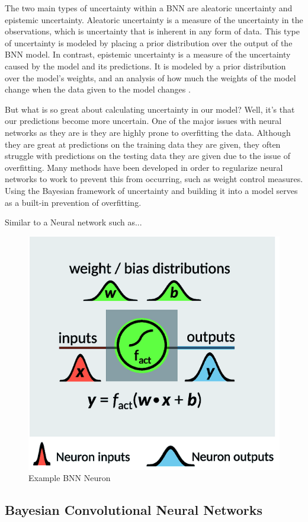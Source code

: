 \documentclass[12pt]{article}
\begin{document}
The two main types of uncertainty within a BNN are aleatoric uncertainty and epistemic uncertainty. Aleatoric uncertainty is a measure of the uncertainty in the observations, which is uncertainty that is inherent in any form of data. This type of uncertainty is modeled by placing a prior distribution over the output of the BNN model. In contrast, epistemic uncertainty is a measure of the uncertainty caused by the model and its predictions. It is modeled by a prior distribution over the model's weights, and an analysis of how much the weights of the model change when the data given to the model changes \cite{shridhar2019comprehensive}.

But what is so great about calculating uncertainty in our model? Well, it's that our predictions become more uncertain. One of the major issues with neural networks as they are is they are highly prone to overfitting the data. Although they are great at predictions on the training data they are given, they often struggle with predictions on the testing data they are given due to the issue of overfitting. Many methods have been developed in order to regularize neural networks to work to prevent this from occurring, such as weight control measures. Using the Bayesian framework of uncertainty and building it into a model serves as a built-in prevention of overfitting.

Similar to a Neural network such as... 

\begin{figure}[H]
	\centering
	\includegraphics[width=.55\textwidth]{../Images/BNN-neuron.png}
	\caption{Example BNN Neuron \cite{hase2019machine}}
\end{figure}

\subsection{Bayesian Convolutional Neural Networks}
\end{document}
